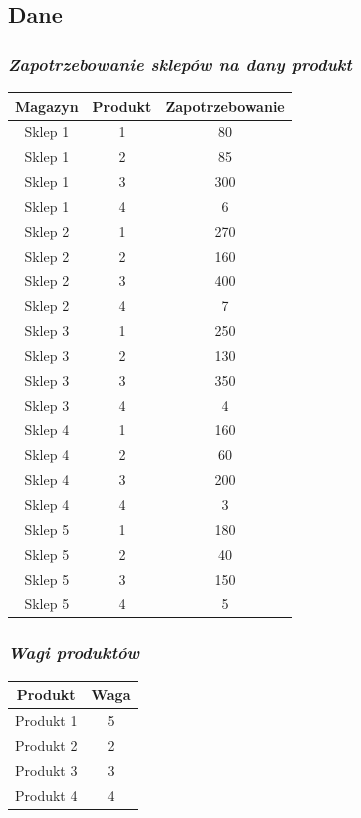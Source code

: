 \documentclass[11pt]{article}
\begin{document}
\subsection{Dane}

\subsubsection{\textit{Zapotrzebowanie sklepów na dany produkt}}
\begin{center}
	\begin{tabular}{ |c|c|c | } 
		\hline
		Magazyn & Produkt & Zapotrzebowanie\\
		\hline
		Sklep 1 & 1 & 80\\ 
		\hline
		Sklep 1 & 2 & 85\\ 
		\hline
		Sklep 1 & 3 & 300\\ 
		\hline
		Sklep 1 & 4 & 6\\ 
		\hline
		Sklep 2 & 1 & 270\\ 
		\hline
		Sklep 2 & 2 & 160\\ 
		\hline
		Sklep 2 & 3 & 400\\ 
		\hline
		Sklep 2 & 4 & 7\\ 
		\hline
		Sklep 3 & 1 & 250\\ 
		\hline
		Sklep 3 & 2 & 130\\ 
		\hline
		Sklep 3 & 3 & 350\\ 
		\hline
		Sklep 3 & 4 & 4\\ 
		\hline
		Sklep 4 & 1 & 160\\ 
		\hline
		Sklep 4 & 2 & 60\\ 
		\hline
		Sklep 4 & 3 & 200\\ 
		\hline
		Sklep 4 & 4 & 3\\ 
		\hline
		Sklep 5 & 1 & 180\\ 
		\hline
		Sklep 5 & 2 & 40\\ 
		\hline
		Sklep 5 & 3 & 150\\ 
		\hline
		Sklep 5 & 4 & 5\\ 
		\hline
	\end{tabular}
\end{center}

\subsubsection{\textit{Wagi produktów}}
\begin{center}
	\begin{tabular}{ |c|c| } 
		\hline
		Produkt & Waga \\
		\hline
		Produkt 1 & 5  \\ 
		\hline
		Produkt 2 & 2  \\ 
		\hline
		Produkt 3 & 3  \\ 
		\hline
		Produkt 4 & 4  \\ 
		\hline
	\end{tabular}
\end{center}
\end{document}

